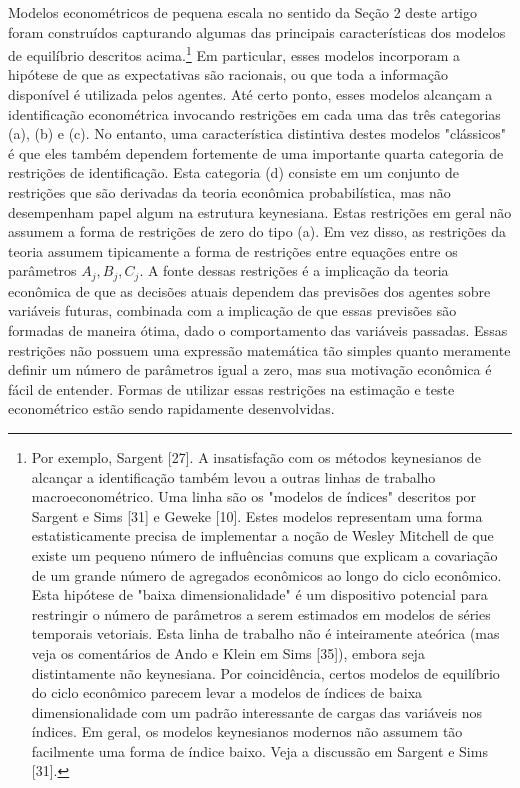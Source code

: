 \documentclass[12pt]{article}
\begin{document}
Modelos econométricos de pequena escala no sentido da Seção 2 deste artigo foram construídos capturando algumas das principais características dos modelos de equilíbrio descritos acima.\footnote{Por exemplo, Sargent [27]. A insatisfação com os métodos keynesianos de alcançar a identificação também levou a outras linhas de trabalho macroeconométrico. Uma linha são os "modelos de índices" descritos por Sargent e Sims [31] e Geweke [10]. Estes modelos representam uma forma estatisticamente precisa de implementar a noção de Wesley Mitchell de que existe um pequeno número de influências comuns que explicam a covariação de um grande número de agregados econômicos ao longo do ciclo econômico. Esta hipótese de "baixa dimensionalidade" é um dispositivo potencial para restringir o número de parâmetros a serem estimados em modelos de séries temporais vetoriais. Esta linha de trabalho não é inteiramente ateórica (mas veja os comentários de Ando e Klein em Sims [35]), embora seja distintamente não keynesiana. Por coincidência, certos modelos de equilíbrio do ciclo econômico parecem levar a modelos de índices de baixa dimensionalidade com um padrão interessante de cargas das variáveis nos índices. Em geral, os modelos keynesianos modernos não assumem tão facilmente uma forma de índice baixo. Veja a discussão em Sargent e Sims [31].} Em particular, esses modelos incorporam a hipótese de que as expectativas são racionais, ou que toda a informação disponível é utilizada pelos agentes. Até certo ponto, esses modelos alcançam a identificação econométrica invocando restrições em cada uma das três categorias (a), (b) e (c). No entanto, uma característica distintiva destes modelos "clássicos" é que eles também dependem fortemente de uma importante quarta categoria de restrições de identificação. Esta categoria (d) consiste em um conjunto de restrições que são derivadas da teoria econômica probabilística, mas não desempenham papel algum na estrutura keynesiana. Estas restrições em geral não assumem a forma de restrições de zero do tipo (a). Em vez disso, as restrições da teoria assumem tipicamente a forma de restrições entre equações entre os parâmetros $A_j, B_j, C_j$. A fonte dessas restrições é a implicação da teoria econômica de que as decisões atuais dependem das previsões dos agentes sobre variáveis futuras, combinada com a implicação de que essas previsões são formadas de maneira ótima, dado o comportamento das variáveis passadas. Essas restrições não possuem uma expressão matemática tão simples quanto meramente definir um número de parâmetros igual a zero, mas sua motivação econômica é fácil de entender. Formas de utilizar essas restrições na estimação e teste econométrico estão sendo rapidamente desenvolvidas.
\end{document}
